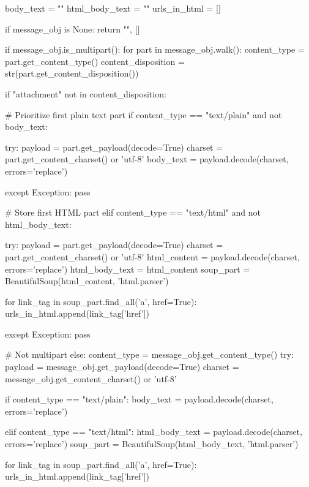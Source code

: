 \begin{ffcode}
    body_text = ""
    html_body_text = ""
    urls_in_html = []

    if message_obj is None: return "", []

    if message_obj.is_multipart():
        for part in message_obj.walk():
            content_type = part.get_content_type()
            content_disposition = str(part.get_content_disposition())

            if "attachment" not in content_disposition:

                # Prioritize first plain text part
                if content_type == "text/plain" and not body_text:

                    try:
                        payload = part.get_payload(decode=True)
                        charset = part.get_content_charset() or 'utf-8'
                        body_text = payload.decode(charset, errors='replace')

                    except Exception: pass

                # Store first HTML part
                elif content_type == "text/html" and not html_body_text:

                    try:
                        payload = part.get_payload(decode=True)
                        charset = part.get_content_charset() or 'utf-8'
                        html_content = payload.decode(charset, errors='replace')
                        html_body_text = html_content
                        soup_part = BeautifulSoup(html_content, 'html.parser')

                        for link_tag in soup_part.find_all('a', href=True):
                            urls_in_html.append(link_tag['href'])

                    except Exception: pass

    # Not multipart
    else:
        content_type = message_obj.get_content_type()
        try:
            payload = message_obj.get_payload(decode=True)
            charset = message_obj.get_content_charset() or 'utf-8'

            if content_type == "text/plain":
                body_text = payload.decode(charset, errors='replace')

            elif content_type == "text/html":
                html_body_text = payload.decode(charset, errors='replace')
                soup_part = BeautifulSoup(html_body_text, 'html.parser')

                for link_tag in soup_part.find_all('a', href=True):
                    urls_in_html.append(link_tag['href'])


\end{ffcode}
